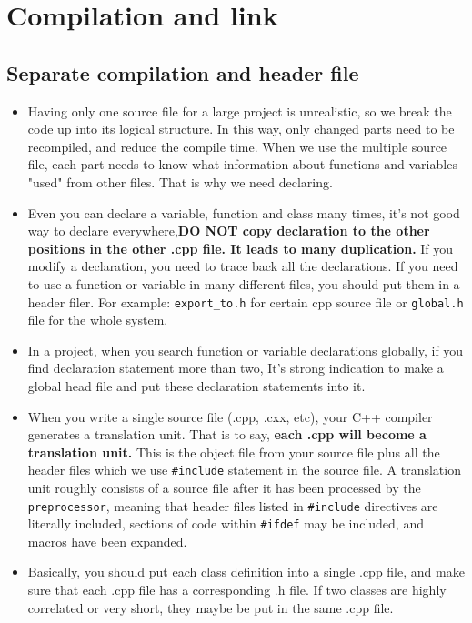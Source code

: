 \documentclass[a4paper,11pt,twoside]{book}
\begin{document}
\section{Compilation and link}

\subsection{Separate compilation and header file}
\begin{itemize}
	\item Having only one source file for a large project is unrealistic, so we break the code up into its logical structure. In this way, only changed parts need to be recompiled, and reduce the compile time. When we use the multiple source file, each part needs to know what information about functions and variables "used" from other files. That is why we need declaring.
	
	\item Even you can declare a variable, function and class many times, it's not good way to declare everywhere,\textbf{DO NOT copy declaration to the other positions in the other .cpp file. It leads to many duplication.} If you modify a declaration, you need to trace back all the declarations. If you need to use a function or variable in many different files, you should put them in a header filer. For example: \texttt{export\_to.h} for certain cpp source file or \texttt{global.h} file for the whole system.

	
	\item In a project, when you search function or variable declarations globally, if you find declaration statement more than two, It's strong indication to make a global head file and put these declaration statements into it.
	
	\item When you write a single source file (.cpp, .cxx, etc),  your C++ compiler generates a translation unit. That is to say, \textbf{each .cpp will become a translation unit.} This is the object file from your source file plus all the header files which we use \texttt{\#include} statement in the source file.  A translation unit roughly consists of a source file after it has been processed by the \texttt{preprocessor}, meaning that header files listed in \texttt{\#include} directives are literally included, sections of code within \texttt{\#ifdef} may be included, and macros have been expanded.
	
	\item Basically, you should put each class definition into a single .cpp file, and make sure that each .cpp file has a corresponding .h file.  If two classes are highly correlated or very short, they maybe be put in the same .cpp file.
	

\end{itemize}
\end{document}
